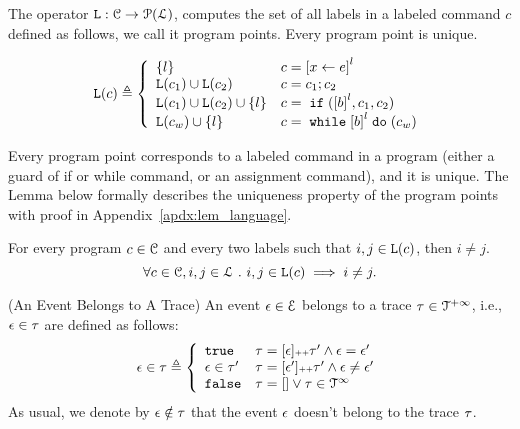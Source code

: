 The operator $\mathtt{L}: \mathcal{C} \to \mathcal{P}(\mathcal{L})$,
computes the set of all labels
in a labeled command $c$ defined as follows, we call it program points.
Every program point is unique.
\begin{defn}
\label{def:progl}
{\small
\[
 \progl(c) \triangleq
 \left\{
 \begin{array}{ll}
 \{l\} 
 & {c} = \clabel{\assign x \expr}^{l} 
 \\
 \progl({c_1}) \cup \progl({{c_2}}) 
 & {c} = {c_1};{c_2}
 \\
 \progl(c_1) \cup \progl({{c_2}}) \cup \{l\} 
 & {c} =\eif(\clabel{\bexpr}^{l}, c_1, c_2) 
 \\
 \progl(c_w) \cup \{l\} 
 & {c} = \ewhile \clabel{\bexpr}^{l} \edo (c_w)
\end{array}
\right.
\]
}
\end{defn}
%
Every program point corresponds to a labeled command in a program (either a guard of if or while command, or an assignment command), and it is unique.
The Lemma below formally describes the uniqueness property of the program points
with proof in Appendix~\ref{apdx:lem_language}.
\begin{lem}
 \label{lem:label_unique}
 For every program $c \in \mathcal{C}$ and every two labels such that
 $i, j \in \mathtt{L}(c)$, then $i \neq j$.
 \[
 \forall c \in \mathcal{C}, i, j \in \mathcal{L} ~.~ i, j \in \mathtt{L}(c)\implies i \neq j.
 \]
\end{lem}
%
\begin{defn}(An Event Belongs to A Trace)
 An event $\mathtt{\epsilon} \in \mathcal{E}$ belongs to a trace $\mathtt{\tau} \in \mathcal{T}^{+\infty}$, i.e., $\mathtt{\epsilon} \in \mathtt{\tau}$ are defined as follows:
%
\begin{equation*}
 \event \in \trace 
 \triangleq \left\{
 \begin{array}{ll} 
 \etrue & \trace = [\event] \tracecat \trace'
 \land \event = \event' \\
 \event \in \trace' & \trace = [\event'] \tracecat \trace'
 \land \event \neq \event' \\ 
 \efalse & \trace = [] \lor \trace \in \inftdom
 \end{array}
 \right.
\end{equation*}
As usual, we denote by $\mathtt{\epsilon} \notin \mathtt{\tau}$ that the event $\mathtt{\epsilon}$ doesn't belong to the trace $\mathtt{\tau}$.
\end{defn}
%
